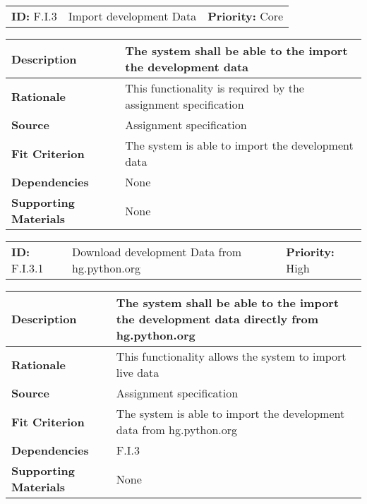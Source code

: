 \begin{table}[H]
    \begin{tabularx}{\textwidth}{| l | X | l |}
        \hline
        \textbf{ID:} F.I.3 & Import development Data & \textbf{Priority:} Core \\
    \end{tabularx}
    \begin{tabularx}{\textwidth}{| l | X |}
        \hline
        \textbf{Description} & The system shall be able to the import the development data \\ \hline
        \textbf{Rationale} & This functionality is required by the assignment specification\\ \hline
        \textbf{Source} & Assignment specification\\ \hline
        \textbf{Fit Criterion} & The system is able to import the development data\\ \hline
        \textbf{Dependencies} & None \\ \hline
        \textbf{Supporting Materials} & None \\ \hline
    \end{tabularx}
\end{table}

\begin{table}[H]
    \begin{tabularx}{\textwidth}{| l | X | l |}
        \hline
        \textbf{ID:} F.I.3.1 & Download development Data from hg.python.org & \textbf{Priority:} High \\
    \end{tabularx}
    \begin{tabularx}{\textwidth}{| l | X |}
        \hline
        \textbf{Description} & The system shall be able to the import the development data directly from hg.python.org \\ \hline
        \textbf{Rationale} & This functionality allows the system to import live data\\ \hline
        \textbf{Source} & Assignment specification\\ \hline
        \textbf{Fit Criterion} & The system is able to import the development data from hg.python.org\\ \hline
        \textbf{Dependencies} & F.I.3 \\ \hline
        \textbf{Supporting Materials} & None \\ \hline
    \end{tabularx}
\end{table}

